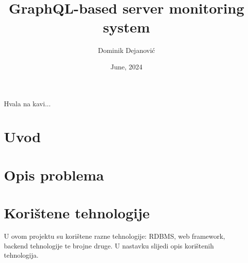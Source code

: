 \documentclass[zavrsnirad]{fer}
\title{GraphQL-based server monitoring system}
\author{Dominik Dejanović}
\date{June, 2024}
\begin{document}
\maketitle






\begin{zahvale}
  Hvala na kavi...
\end{zahvale}


\mainmatter


\tableofcontents


\chapter{Uvod}
\label{pog:uvod}


\chapter{Opis problema}
\label{pog:opis_problema}


\chapter{Korištene tehnologije}
\label{pog:koristene_tehnologije}
U ovom projektu su korištene razne tehnologije: RDBMS, web framework, backend tehnologije te brojne druge. U nastavku slijedi opis korištenih tehnologija.
\end{document}
